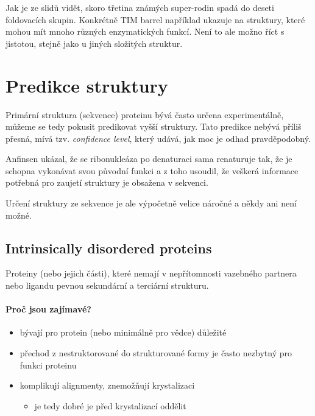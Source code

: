 \documentclass[DIV=8]{scrreprt}
\begin{document}
Jak je ze slidů vidět, skoro třetina známých super-rodin spadá do deseti foldovacích skupin. Konkrétně TIM barrel například ukazuje na struktury, které mohou mít mnoho různých enzymatických funkcí. Není to ale možno říct s jistotou, stejně jako u jiných složitých struktur.


\section{Predikce struktury} \label{Predikce struktury}


Primární struktura (sekvence) proteinu bývá často určena experimentálně, můžeme se tedy pokusit predikovat vyšší struktury. Tato predikce nebývá příliš přesná, mívá tzv. \emph{confidence level}, který udává, jak moc je odhad pravděpodobný.

Anfinsen ukázal, že se ribonukleáza po denaturaci sama renaturuje tak, že je schopna vykonávat svou původní funkci a z toho usoudil, že veškerá informace potřebná pro zaujetí struktury je obsažena v sekvenci.

Určení struktury ze sekvence je ale výpočetně velice náročné a někdy ani není možné.

\subsection{Intrinsically disordered proteins} \label{Intrinsically disordered proteins}


Proteiny (nebo jejich části), které nemají v nepřítomnosti vazebného partnera nebo ligandu pevnou sekundární a terciární strukturu.

\paragraph{Proč jsou zajímavé?}
\begin{itemize}[nosep]
    \item bývají pro protein (nebo minimálně pro vědce) důležité
    \item přechod z nestruktorované do strukturované formy je často nezbytný pro funkci proteinu
    \item komplikují alignmenty, znemožňují krystalizaci
\begin{itemize}[nosep]
    \item je tedy dobré je před krystalizací oddělit
\end{itemize}

\end{itemize}
\end{document}
